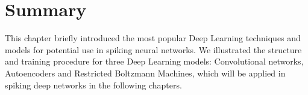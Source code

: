 
\section{Summary}
This chapter briefly introduced the most popular Deep Learning techniques and models for potential use in spiking neural networks.
We illustrated the structure and training procedure for three Deep Learning models: Convolutional networks, Autoencoders and Restricted Boltzmann Machines, which will be applied in spiking deep networks in the following chapters.